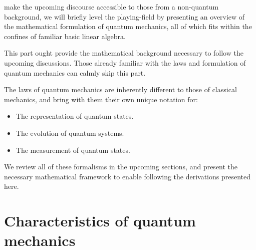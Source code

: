  make the upcoming discourse accessible to those from a non-quantum background, we will briefly level the playing-field by presenting an overview of the mathematical formulation of quantum mechanics, all of which fits within the confines of familiar basic linear algebra.

This part ought provide the mathematical background necessary to follow the upcoming discussions. Those already familiar with the laws and formulation of quantum mechanics can calmly skip this part.

The laws of quantum mechanics are inherently different to those of classical mechanics, and bring with them their own unique notation for:
\begin{itemize}
	\item The representation of quantum states.
	\item The evolution of quantum systems.
	\item The measurement of quantum states.
\end{itemize}
We review all of these formalisms in the upcoming sections, and present the necessary mathematical framework to enable following the derivations presented here.

%
%

\section{Characteristics of quantum mechanics}

